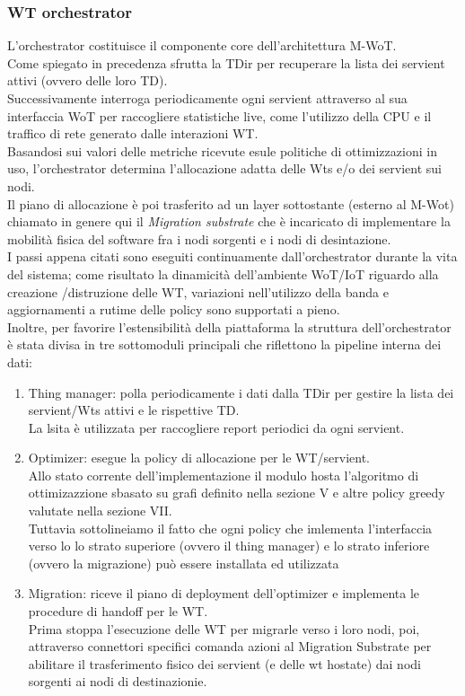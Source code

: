 \documentclass[11pt]{article}
\begin{document}
		\subsubsection{WT orchestrator}
		L'orchestrator costituisce il componente core dell'architettura M-WoT. \\
		Come spiegato in precedenza sfrutta la TDir per recuperare la lista dei servient attivi (ovvero delle loro TD).\\
		Successivamente interroga periodicamente ogni servient attraverso al sua interfaccia WoT per raccogliere statistiche live, come l'utilizzo della CPU e il traffico di rete generato dalle interazioni WT. \\
		Basandosi sui valori delle metriche ricevute esule politiche di ottimizzazioni in uso, l'orchestrator determina l'allocazione adatta delle Wts e/o dei servient sui nodi. \\
		Il piano di allocazione è poi trasferito ad un layer sottostante (esterno al M-Wot) chiamato in genere qui il \textit{Migration substrate} che è incaricato di implementare la mobilità fisica del software fra i nodi sorgenti e i nodi di desintazione. \\
		I passi appena citati sono eseguiti continuamente dall'orchestrator durante la vita del sistema; come risultato la dinamicità dell'ambiente WoT/IoT riguardo alla creazione /distruzione delle WT, variazioni nell'utilizzo della banda e aggiornamenti a rutime delle policy sono supportati a pieno. \\
		Inoltre, per favorire l'estensibilità della piattaforma la struttura dell'orchestrator è stata divisa in tre sottomoduli principali che riflettono la pipeline interna dei dati:
		\begin{enumerate}
			\item Thing manager: polla periodicamente i dati dalla TDir per gestire la lista dei servient/Wts attivi e le rispettive TD. \\
			La lsita è utilizzata per raccogliere report periodici da ogni servient.
			\item Optimizer: esegue la policy di allocazione per le WT/servient. \\
			Allo stato corrente dell'implementazione il modulo hosta l'algoritmo di ottimizazzione sbasato su grafi definito nella sezione V e altre policy greedy valutate nella sezione VII.\\
			Tuttavia sottolineiamo il fatto che ogni policy che imlementa l'interfaccia verso lo lo strato superiore (ovvero il thing manager) e lo strato inferiore (ovvero la migrazione)  può essere installata ed utilizzata
			\item Migration: riceve il piano di deployment dell'optimizer e implementa le procedure di handoff per le WT. \\
			Prima stoppa l'esecuzione delle WT per migrarle verso i loro nodi, poi, attraverso connettori specifici comanda azioni al Migration Substrate per abilitare il trasferimento fisico dei servient (e delle wt hostate) dai nodi sorgenti ai nodi di destinazionie.
		\end{enumerate}
\end{document}
